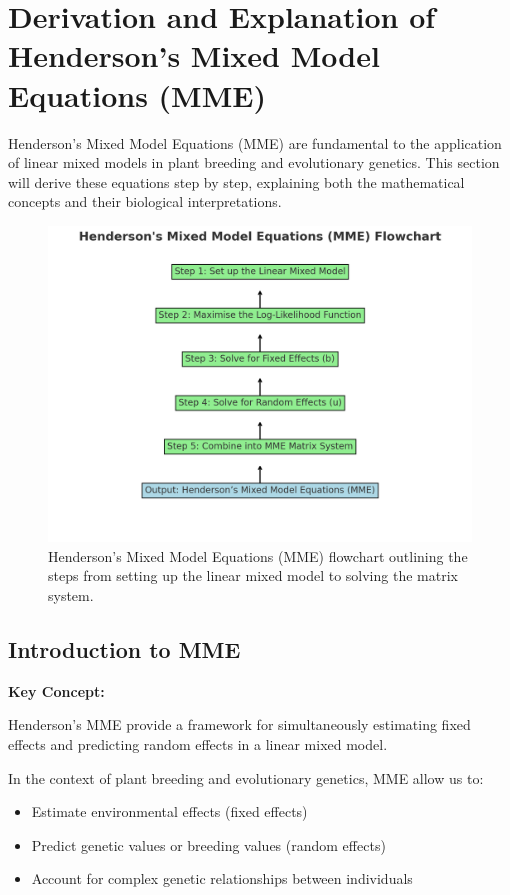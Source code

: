 \documentclass[12pt,a4paper]{article}
\newenvironment{keyconceptbox}[1][]
{\begin{basebox}[linecolor=uqblue]
\textbf{\color{uqblue}Key Concept:} \textit{#1}\par\noindent\ignorespaces}
{\end{basebox}}
\begin{document}
\section{Derivation and Explanation of Henderson's Mixed Model Equations (MME)}

Henderson's Mixed Model Equations (MME) are fundamental to the application of linear mixed models in plant breeding and evolutionary genetics. This section will derive these equations step by step, explaining both the mathematical concepts and their biological interpretations.

\begin{figure}[h]
    \centering
    \includegraphics[width=1\textwidth]{hendersonMME_FC.png}
    \caption{Henderson's Mixed Model Equations (MME) flowchart outlining the steps from setting up the linear mixed model to solving the matrix system.}
    \label{fig:henderson-mme-flowchart}
\end{figure}


\subsection{Introduction to MME}

\begin{keyconceptbox}
    
Henderson's MME provide a framework for simultaneously estimating fixed effects and predicting random effects in a linear mixed model.
\end{keyconceptbox}

In the context of plant breeding and evolutionary genetics, MME allow us to:
\begin{itemize}
    \item Estimate environmental effects (fixed effects)
    \item Predict genetic values or breeding values (random effects)
    \item Account for complex genetic relationships between individuals
\end{itemize}
\end{document}
